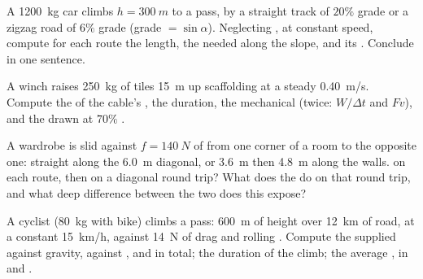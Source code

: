 \begin{exercise}[$\star\star\star$]\label{exo:g11:work-of-force:12}
A \qty{1200}{kg} car climbs $h = \qty{300}{m}$ to a pass, by a straight
track of $20\%$ grade or a zigzag road of $6\%$ grade (grade $=
\sin\alpha$). Neglecting , at constant speed, compute for each
route the length, the  needed along the slope, and its .
Conclude in one sentence.
\end{exercise}

\begin{exercise}[$\star\star\star$]\label{exo:g11:work-of-force:13}
A winch raises \qty{250}{kg} of tiles \qty{15}{m} up scaffolding at a
steady \qty{0.40}{m/s}. Compute the  of the cable's , the
duration, the mechanical  (twice: $W/\Delta t$ and $Fv$), and
the  drawn at $70\%$  .
\end{exercise}

\begin{exercise}[$\star\star\star$]\label{exo:g11:work-of-force:14}
A wardrobe is slid against $f = \qty{140}{N}$ of  from one
corner of a room to the opposite one: straight along the \qty{6.0}{m}
diagonal, or \qty{3.6}{m} then \qty{4.8}{m} along the walls. 
 on each route, then on a diagonal round trip? What does the
 do on that round trip, and what deep difference between the
two  does this expose?
\end{exercise}

\begin{exercise}[$\star\star\star$]\label{exo:g11:work-of-force:15}
A cyclist (\qty{80}{kg} with bike) climbs a pass: \qty{600}{m} of
height over \qty{12}{km} of road, at a constant \qty{15}{km/h},
against \qty{14}{N} of drag and rolling . Compute the 
supplied against gravity, against , and in total; the
duration of the climb; the average , in  and .
\end{exercise}

